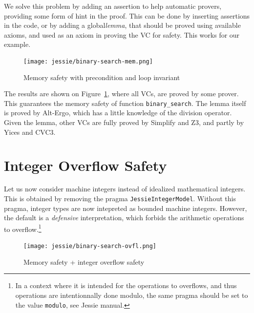 \documentclass[a4paper,11pt,twoside,openright]{report}
\newcommand{\negtenthspace}{\hspace*{-0.1\linewidth}}
\begin{document}
We solve this problem by adding an assertion to help automatic
provers, providing some form of hint in the proof. This can be done by
inserting assertions in the code, or by adding a global\emph{lemma}, that
should be proved using available axioms, and used as an axiom in
proving the VC for safety. This works for our example.



\begin{figure}[t]
  \begin{center}
    \texttt{[image: jessie/binary-search-mem.png]}
  \end{center}
  \caption{Memory safety with precondition and loop invariant}
  \label{fig:mem}
  \hrulefill
\end{figure}

The results are shown on Figure~\ref{fig:mem}, where all VCs, are
proved by some prover. This guarantees the memory safety of function
\verb|binary_search|. The lemma itself is proved by Alt-Ergo, which
has a little knowledge of the division operator. Given the lemma,
other VCs are fully proved by Simplify and Z3, and partly by Yices and
CVC3.



\section{Integer Overflow Safety}

Let us now consider machine integers instead of idealized mathematical
integers. This is obtained by removing the pragma
\texttt{JessieIntegerModel}.  Without this pragma, integer types are
now intepreted as bounded machine integers. However, the default is a
\emph{defensive} interpretation, which forbids the arithmetic
operations to overflow.\footnote{In a context where it is intended for
  the operations to overflows, and thus operations are intentionnally
  done modulo, the same pragma should be set to the value
  \texttt{modulo}, see Jessie manual.}

\begin{figure}[t]
  \begin{center}
    \negtenthspace\texttt{[image: jessie/binary-search-ovfl.png]}
  \end{center}
  \caption{Memory safety + integer overflow safety}
  \label{fig:ovfl}
  \hrulefill
\end{figure}
\end{document}
